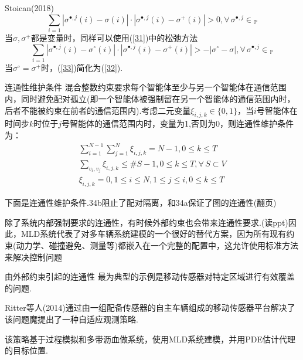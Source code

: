 \documentclass[notheorems,11pt]{beamer}
\theoremstyle{plain}
\numberwithin{theorem}{section}
\numberwithin{lemma}{section}
\numberwithin{corollary}{section}
\theoremstyle{example}
\begin{document}
\begin{frame}{Stoican(2018)}
  \begin{equation}
    \sum_{i=1}{|\sigma^{\bullet,j}(i)-\sigma(i)|\cdot|\sigma^{\bullet,j}(i)-\sigma^+(i)|}>0,\forall\,\sigma^{\bullet,j}\in\textstyle_{\mathbb{P}} \label{32}
  \end{equation}
  当$\sigma,\sigma^+$都是变量时，同样可以使用(\ref{31})中的松弛方法
  \begin{equation}
    \sum_{i=1}{|\sigma^{\bullet,j}(i)-\sigma^\circ(i)|\cdot|\sigma^{\bullet,j}(i)-\sigma^+(i)|}>-|\sigma^\circ-\sigma|,\forall\,\sigma^{\bullet,j}\in\textstyle_{\mathbb{P}} \label{33}
  \end{equation}
  当$\sigma^\circ=\sigma^+$时，(\ref{33})简化为(\ref{32}).
\end{frame}

\begin{frame}{连通性维护条件}
  混合整数约束要求每个智能体至少与另一个智能体在通信范围内，同时避免配对孤立(即一个智能体被强制留在另一个智能体的通信范围内时，后者不能被约束在前者的通信范围内).考虑二元变量$\xi_{i,j,k}\in\{0,1\}$，当$i$号智能体在时间步$k$时位于$j$号智能体的通信范围内时，变量为1,否则为0，则连通性维护条件为：
  \begin{subequations}
    \begin{gather}
      \sum_{i=1}^{N-1}\sum_{j=1}^N\xi_{i,j,k}=N-1,0\leqslant k\leqslant T \\
      \sum_{v_i,v_j}\xi_{i,j,k}\leqslant \# S-1,0\leqslant k\leqslant T,\forall\, S\subset V \\
      \xi_{i,j,k}=0,1\leqslant i\leqslant N,1\leqslant j\leqslant i,0\leqslant k\leqslant T 
    \end{gather}
  \end{subequations}
\end{frame}

\begin{frame}
  下面是连通性维护条件.34b阻止了配对隔离，和34a保证了图的连通性(翻页) \par \vspace{1 em}
  除了系统内部强制要求的连通性，有时候外部约束也会带来连通性要求.(读ppt)因此，MLD系统代表了对多车辆系统建模的一个很好的替代方案，因为所有现有约束(动力学、碰撞避免、测量等)都嵌入在一个完整的配置中，这允许使用标准方法来解决控制问题
\end{frame}

\begin{frame}{由外部约束引起的连通性}
  最为典型的示例是移动传感器对特定区域进行有效覆盖的问题.\par
  \vspace{1 em}
  Ritter等人(2014)通过由一组配备传感器的自主车辆组成的移动传感器平台解决了该问题魔提出了一种自适应观测策略.\par
  该策略基于过程模拟和多带沥血做系统，使用MLD系统建模，并用PDE估计代理的目标位置.
\end{frame}
\end{document}

